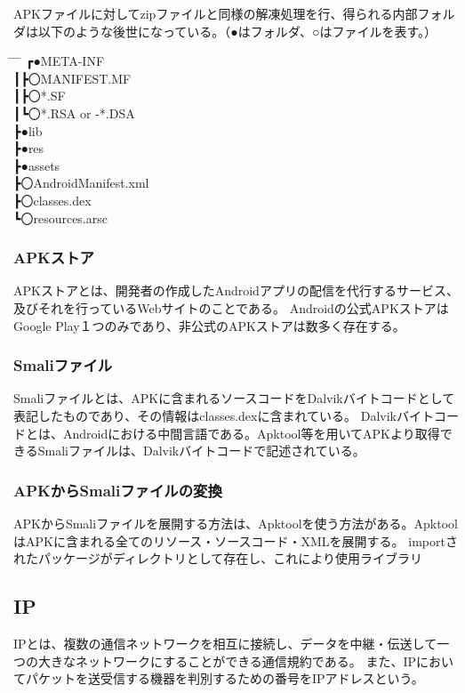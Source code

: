 \documentclass[a4j]{jarticle}
\begin{document}
APKファイルに対してzipファイルと同様の解凍処理を行、得られる内部フォルダは以下のような後世になっている。（●はフォルダ、○はファイルを表す。）
\begin{tabbing}
 \hspace{8mm} \= \hspace{10mm} \= \hspace{12mm} \= \hspace{15mm} \kill
\>┏●META-INF
\\\>┃\>┣〇MANIFEST.MF
\\\>┃\>┣〇*.SF
\\\>┃\>┗〇*.RSA or -*.DSA
\\\>┣●lib
\\\>┣●res
\\\>┣●assets
\\\>┣〇AndroidManifest.xml
\\\>┣〇classes.dex
\\\>┗〇resources.arsc
\end{tabbing}

\subsubsection{APKストア}
APKストアとは、開発者の作成したAndroidアプリの配信を代行するサービス、及びそれを行っているWebサイトのことである。
Androidの公式APKストアはGoogle Play１つのみであり、非公式のAPKストアは数多く存在する。
\subsubsection{Smaliファイル}
Smaliファイルとは、APKに含まれるソースコードをDalvikバイトコードとして表記したものであり、その情報はclasses.dexに含まれている。
Dalvikバイトコードとは、Androidにおける中間言語である。Apktool等を用いてAPKより取得できるSmaliファイルは、Dalvikバイトコードで記述されている。
\subsubsection{APKからSmaliファイルの変換}
APKからSmaliファイルを展開する方法は、Apktoolを使う方法がある。ApktoolはAPKに含まれる全てのリソース・ソースコード・XMLを展開する。
importされたパッケージがディレクトリとして存在し、これにより使用ライブラリ

\subsection{IP}
IPとは、複数の通信ネットワークを相互に接続し、データを中継・伝送して一つの大きなネットワークにすることができる通信規約である。
また、IPにおいてパケットを送受信する機器を判別するための番号をIPアドレスという。
\end{document}
